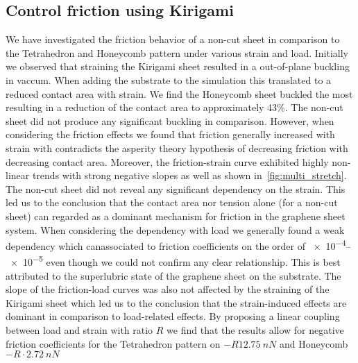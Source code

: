\subsection{Control friction using Kirigami}
We have investigated the friction behavior of a non-cut sheet in comparison to
the Tetrahedron and Honeycomb pattern under various strain and load. Initially
we observed that straining the Kirigami sheet resulted in a out-of-plane
buckling in vaccum. When adding the substrate to the simulation this translated
to a reduced contact area with strain. We find the Honeycomb sheet buckled the
most resulting in a reduction of the contact area to approximately 43\%. The
non-cut sheet did not produce any significant buckling in comparison. However,
when considering the friction effects we found that friction generally increased
with strain with contradicts the asperity theory hypothesis of decreasing
friction with decreasing contact area. Moreover, the friction-strain curve
exhibited highly non-linear trends with strong negative slopes as well as shown
in~\cref{fig:multi_stretch}. The non-cut sheet did not reveal any significant
dependency on the strain. This led us to the conclusion that the contact area nor tension alone (for a non-cut sheet) can regarded as a dominant mechanism for friction in the graphene sheet system. When considering the dependency with load we generally found a weak dependency which canassociated to friction coefficients on the order of \num{e-4}--\num{e-5} even though we could not confirm any clear relationship. This is best attributed to the superlubric state of the graphene sheet on the substrate. The slope of the friction-load curves was also not affected by the straining of the Kirigami sheet which led us to the conclusion that the strain-induced effects are dominant in comparison to load-related effects. By proposing a linear coupling between load and strain with ratio $R$ we find that the results allow for negative friction coefficients for the Tetrahedron pattern on $-R\SI{12.75}{nN}$ and Honeycomb $-R\cdot\SI{2.72}{nN}$




